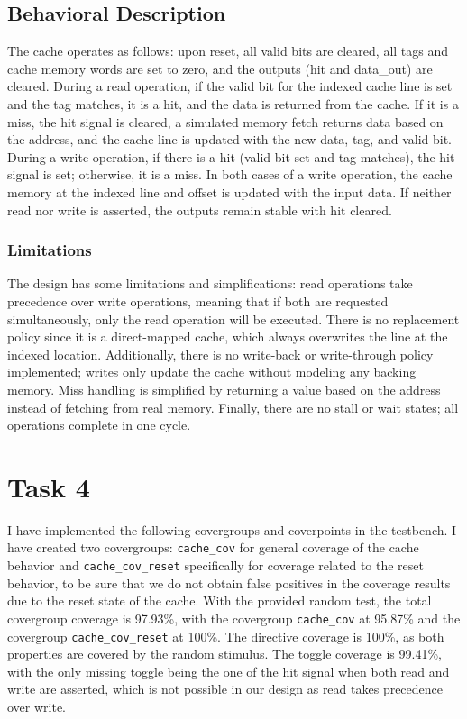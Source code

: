 \documentclass{article}
\begin{document}
\subsection*{Behavioral Description}

The cache operates as follows: upon reset, all valid bits are cleared, all tags and cache memory words are set to zero, and the outputs (hit and data\_out) are cleared. 
During a read operation, if the valid bit for the indexed cache line is set and the tag matches, it is a hit, and the data is returned from the cache. If it is a miss, the hit signal is cleared, a simulated memory fetch returns data based on the address, and the cache line is updated with the new data, tag, and valid bit. 
During a write operation, if there is a hit (valid bit set and tag matches), the hit signal is set; otherwise, it is a miss. 
In both cases of a write operation, the cache memory at the indexed line and offset is updated with the input data. If neither read nor write is asserted, the outputs remain stable with hit cleared.

\subsubsection*{Limitations}
The design has some limitations and simplifications: read operations take precedence over write operations, meaning that if both are requested simultaneously, only the read operation will be executed. 
There is no replacement policy since it is a direct-mapped cache, which always overwrites the line at the indexed location. 
Additionally, there is no write-back or write-through policy implemented; writes only update the cache without modeling any backing memory. 
Miss handling is simplified by returning a value based on the address instead of fetching from real memory. Finally, there are no stall or wait states; all operations complete in one cycle.

\section*{Task 4}
I have implemented the following covergroups and coverpoints in the testbench. I have created two covergroups: \texttt{cache\_cov} for general coverage of the cache behavior and \texttt{cache\_cov\_reset} specifically for coverage related to the reset behavior, to be sure that we do not obtain false positives in the coverage results due to the reset state of the cache.
With the provided random test, the total covergroup coverage is 97.93\%, with the covergroup \texttt{cache\_cov} at 95.87\% and the covergroup \texttt{cache\_cov\_reset} at 100\%. 
The directive coverage is 100\%, as both properties are covered by the random stimulus.
The toggle coverage is 99.41\%, with the only missing toggle being the one of the hit signal when both read and write are asserted, which is not possible in our design as read takes precedence over write.
\end{document}
